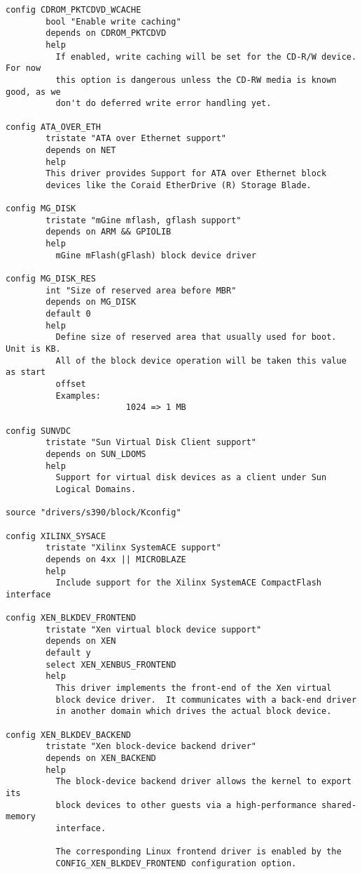 \documentclass[journal,10pt,onecolumn,compsoc,letterpaper,draftclsnofoot,table,xcdraw]{IEEEtran} \usepackage[margin=0.75in]{geometry}
\begin{document}
\begin{verbatim}
config CDROM_PKTCDVD_WCACHE
        bool "Enable write caching"
        depends on CDROM_PKTCDVD
        help
          If enabled, write caching will be set for the CD-R/W device. For now
          this option is dangerous unless the CD-RW media is known good, as we
          don't do deferred write error handling yet.

config ATA_OVER_ETH
        tristate "ATA over Ethernet support"
        depends on NET
        help
        This driver provides Support for ATA over Ethernet block
        devices like the Coraid EtherDrive (R) Storage Blade.

config MG_DISK
        tristate "mGine mflash, gflash support"
        depends on ARM && GPIOLIB
        help
          mGine mFlash(gFlash) block device driver

config MG_DISK_RES
        int "Size of reserved area before MBR"
        depends on MG_DISK
        default 0
        help
          Define size of reserved area that usually used for boot. Unit is KB.
          All of the block device operation will be taken this value as start
          offset
          Examples:
                        1024 => 1 MB

config SUNVDC
        tristate "Sun Virtual Disk Client support"
        depends on SUN_LDOMS
        help
          Support for virtual disk devices as a client under Sun
          Logical Domains.

source "drivers/s390/block/Kconfig"

config XILINX_SYSACE
        tristate "Xilinx SystemACE support"
        depends on 4xx || MICROBLAZE
        help
          Include support for the Xilinx SystemACE CompactFlash interface

config XEN_BLKDEV_FRONTEND
        tristate "Xen virtual block device support"
        depends on XEN
        default y
        select XEN_XENBUS_FRONTEND
        help
          This driver implements the front-end of the Xen virtual
          block device driver.  It communicates with a back-end driver
          in another domain which drives the actual block device.

config XEN_BLKDEV_BACKEND
        tristate "Xen block-device backend driver"
        depends on XEN_BACKEND
        help
          The block-device backend driver allows the kernel to export its
          block devices to other guests via a high-performance shared-memory
          interface.

          The corresponding Linux frontend driver is enabled by the
          CONFIG_XEN_BLKDEV_FRONTEND configuration option.


\end{verbatim}
\end{document}
